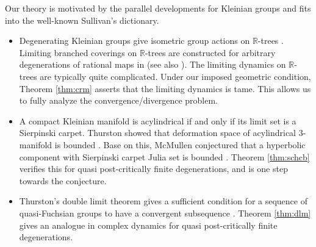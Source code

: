 \documentclass[11pt, reqno]{amsart}
\numberwithin{equation}{section}
\theoremstyle{plain}
\theoremstyle{theorem}
\theoremstyle{definition}
\newcommand{\R}{\mathbb{R}}
\numberwithin{figure}{section}
\begin{document}
Our theory is motivated by the parallel developments for Kleinian groups and fits into the well-known Sullivan's dictionary.
\begin{itemize}
\item Degenerating Kleinian groups give isometric group actions on $\R$-trees \cite{MorganShalen84, Bestvina88, Paulin88}.
Limiting branched coverings on $\R$-trees are constructed for arbitrary degenerations of rational maps in \cite{L19p, L19b} (see also \cite{McM09, Kiwi15}).
The limiting dynamics on $\R$-trees are typically quite complicated.
Under our imposed geometric condition, Theorem \ref{thm:crm} asserts that the limiting dynamics is tame.
This allows us to fully analyze the convergence/divergence problem.

\item A compact Kleinian manifold is acylindrical if and only if its limit set is a Sierpinski carpet.
Thurston showed that deformation space of acylindrical $3$-manifold is bounded \cite{Thurston86}.
Base on this, McMullen conjectured that a hyperbolic component with Sierpinski carpet Julia set is bounded \cite{McM95}.
Theorem \ref{thm:schcb} verifies this for quasi post-critically finite degenerations, and is one step towards the conjecture.

\item Thurston's double limit theorem gives a sufficient condition for a sequence of quasi-Fuchsian groups to have a convergent subsequence \cite{Thurston98}.
Theorem \ref{thm:dlm} gives an analogue in complex dynamics for quasi post-critically finite degenerations.
\end{itemize}

\end{document}
